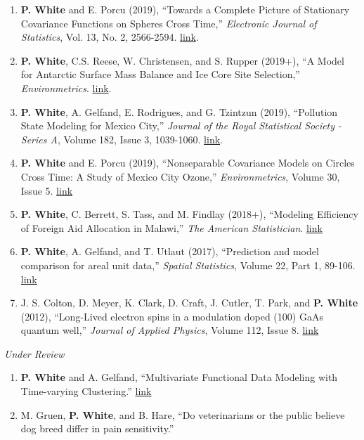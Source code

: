 \documentclass[11pt]{article}
\begin{document}
\begin{enumerate}[label=$\cdot$]
\item \textbf{P. White} and E. Porcu (2019), ``Towards a Complete Picture of Stationary Covariance Functions on Spheres Cross Time,'' \emph{Electronic Journal of Statistics}, Vol. 13, No. 2, 2566-2594. \href{https://doi.org/10.1214/19-EJS1593}{link}.
\item \textbf{P. White}, C.S. Reese, W. Christensen, and S. Rupper (2019+), ``A Model for Antarctic Surface Mass Balance and Ice Core Site Selection,'' \emph{Environmetrics}. \href{https://onlinelibrary.wiley.com/doi/abs/10.1002/env.2579}{link}.
\item \textbf{P. White}, A. Gelfand, E. Rodrigues, and G. Tzintzun (2019), ``Pollution State Modeling for Mexico City,'' \emph{Journal of the Royal Statistical Society - Series A}, Volume 182, Issue 3, 1039-1060. \href{https://rss.onlinelibrary.wiley.com/doi/abs/10.1111/rssa.12444}{link}.
\item \textbf{P. White} and E. Porcu (2019), ``Nonseparable Covariance Models on Circles Cross Time: A Study of Mexico City Ozone,'' \emph{Environmetrics}, Volume 30, Issue 5. \href{https://onlinelibrary.wiley.com/doi/full/10.1002/env.2558}{link}
\item \textbf{P. White}, C. Berrett, S. Tass, and M. Findlay (2018+), ``Modeling Efficiency of Foreign Aid Allocation in Malawi,'' \emph{The American Statistician}.  \href{https://www.tandfonline.com/doi/full/10.1080/00031305.2018.1470032}{link}
\item \textbf{P. White}, A. Gelfand, and T. Utlaut (2017), ``Prediction and model comparison for areal unit data,'' \emph{Spatial Statistics}, Volume 22, Part 1, 89-106. \href{http://www.sciencedirect.com/science/article/pii/S2211675317301422}{link}
\item J. S. Colton, D. Meyer, K. Clark, D. Craft, J. Cutler, T. Park, and \textbf{P. White} (2012), ``Long-Lived electron spins in a modulation doped (100) GaAs quantum well,'' \emph{Journal of Applied Physics}, Volume 112, Issue 8.  \href{http://aip.scitation.org/doi/abs/10.1063/1.4759320}{link}
\end{enumerate}

\emph{Under Review}

\begin{enumerate}[label=$\cdot$]
\item \textbf{P. White} and A. Gelfand, ``Multivariate Functional Data Modeling with Time-varying Clustering.'' \href{https://arxiv.org/abs/1904.11518}{link}
\item M. Gruen, \textbf{P. White}, and B. Hare, ``Do veterinarians or the public believe dog breed differ in pain sensitivity.''
\end{enumerate}
\end{document}
